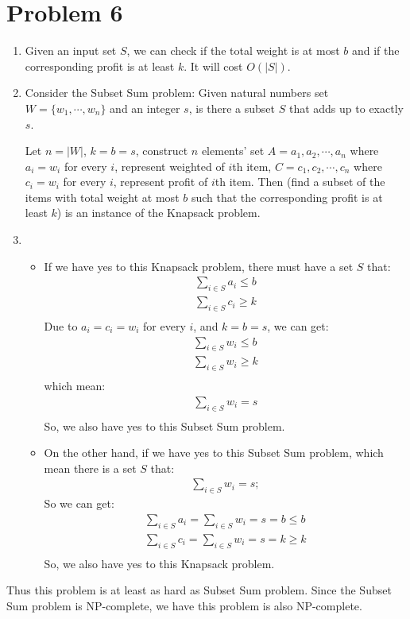 \documentclass{article}
\begin{document}
\section*{Problem 6}
\begin{enumerate}[1)]
    \item Given an input set $S$, we can check if the total weight is at most $b$ and if the corresponding profit is at least $k$. 
    It will cost $O(|S|)$.
    \item Consider the Subset Sum problem: Given natural numbers set $W =\{w_1 , \cdots, w_n\}$ and an integer $s$, is there a subset $S$ that adds up to exactly $s$.
    
    Let $n=|W|$, $k=b=s$, construct $n$ elements' set $A={a_1,a_2,\cdots,a_n}$ where $a_i=w_i$ for every $i$, 
    represent weighted of $i$th item, 
    $C={c_1,c_2,\cdots,c_n}$ where $c_i=w_i$ for every $i$, 
    represent profit of $i$th item.
    Then (find a subset of the items with total weight at most $b$ such that the corresponding profit is at least $k$) is an instance of the Knapsack problem.
    
    \item 
    \begin{itemize}
        \item 
    If we have yes to this Knapsack problem, there must have a set $S$ that:
    \begin{gather*}
        \sum_{i\in S}a_i \leqslant b \\
        \sum_{i\in S}c_i \geqslant k \\
    \end{gather*}
    Due to $a_i=c_i=w_i$ for every $i$, and $k=b=s$, we can get:
    \begin{gather*}
        \sum_{i\in S}w_i \leqslant b \\
        \sum_{i\in S}w_i \geqslant k \\
    \end{gather*}
    which mean:
    \begin{gather*}
        \sum_{i\in S}w_i = s \\
    \end{gather*}
    So, we also have yes to this Subset Sum problem.

    \item
    On the other hand, if we have yes to this Subset Sum problem, 
    which mean there is a set $S$ that:
    \begin{gather*}
        \sum_{i\in S}w_i = s;
    \end{gather*}
    So we can get:
    \begin{gather*}
        \sum_{i\in S}a_i =\sum_{i\in S}w_i=s=b \leqslant b \\
        \sum_{i\in S}c_i =\sum_{i\in S}w_i=s=k \geqslant k \\
    \end{gather*}
    So, we also have yes to this Knapsack problem.
    \end{itemize}
\end{enumerate}

Thus this problem is at least as hard as Subset Sum problem.
Since the Subset Sum problem is NP-complete, 
we have this problem is also NP-complete.
\end{document}
